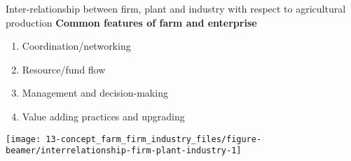 \documentclass[12pt,ignorenonframetext,aspectratio=169]{beamer}
\providecommand{\tightlist}{%
  \setlength{\itemsep}{0pt}\setlength{\parskip}{0pt}}
\begin{document}
\begin{frame}{Inter-relationship between firm, plant and industry with
respect to agricultural production}
\protect\hypertarget{inter-relationship-between-firm-plant-and-industry-with-respect-to-agricultural-production}{}
\textbf{Common features of farm and enterprise}

\begin{enumerate}
\tightlist
\item
  Coordination/networking
\item
  Resource/fund flow
\item
  Management and decision-making
\item
  Value adding practices and upgrading
\end{enumerate}

\texttt{[image: 13-concept\_farm\_firm\_industry\_files/figure-beamer/interrelationship-firm-plant-industry-1]}
\end{frame}
\end{document}
